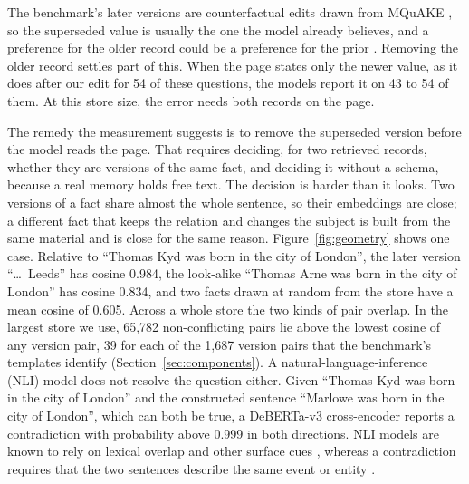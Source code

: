 \documentclass{CUP-JNL-NLP}
\begin{document}
The benchmark's later versions are counterfactual edits drawn from MQuAKE \citep{zhong2023mquake}, so the superseded value is usually the one the model already believes, and a preference for the older record could be a preference for the prior \citep{longpre2021entity,xie2024adaptive}. Removing the older record settles part of this. When the page states only the newer value, as it does after our edit for 54 of these questions, the models report it on 43 to 54 of them. At this store size, the error needs both records on the page.

The remedy the measurement suggests is to remove the superseded version before the model reads the page. That requires deciding, for two retrieved records, whether they are versions of the same fact, and deciding it without a schema, because a real memory holds free text. The decision is harder than it looks. Two versions of a fact share almost the whole sentence, so their embeddings are close; a different fact that keeps the relation and changes the subject is built from the same material and is close for the same reason. Figure~\ref{fig:geometry} shows one case. Relative to ``Thomas Kyd was born in the city of London'', the later version ``\ldots\ Leeds'' has cosine 0.984, the look-alike ``Thomas Arne was born in the city of London'' has cosine 0.834, and two facts drawn at random from the store have a mean cosine of 0.605. Across a whole store the two kinds of pair overlap. In the largest store we use, 65,782 non-conflicting pairs lie above the lowest cosine of any version pair, 39 for each of the 1,687 version pairs that the benchmark's templates identify (Section~\ref{sec:components}). A natural-language-inference (NLI) model does not resolve the question either. Given ``Thomas Kyd was born in the city of London'' and the constructed sentence ``Marlowe was born in the city of London'', which can both be true, a DeBERTa-v3 cross-encoder reports a contradiction with probability above 0.999 in both directions. NLI models are known to rely on lexical overlap and other surface cues \citep{gururangan2018annotation,mccoy2019right}, whereas a contradiction requires that the two sentences describe the same event or entity \citep{demarneffe2008finding}.
\end{document}
